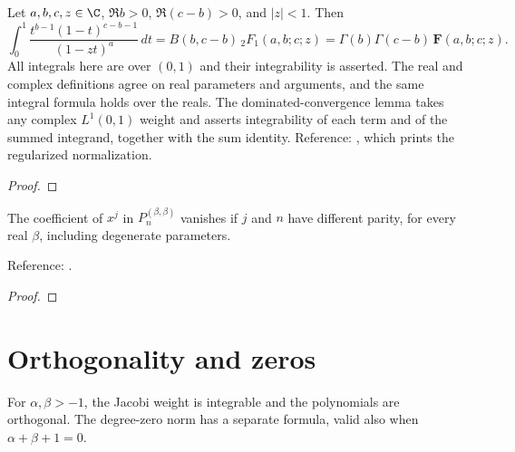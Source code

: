 \begin{supporting}
\begin{theorem}
\label{thm:hypergeometric-euler-integral}
\leanok
Let $a,b,c,z\in\C$, $\Re b>0$, $\Re(c-b)>0$, and $|z|<1$. Then
\[
 \int_0^1\frac{t^{b-1}(1-t)^{c-b-1}}{(1-zt)^a}\,dt
 = B(b,c-b)\,{}_2F_1(a,b;c;z)
 = \Gamma(b)\Gamma(c-b)\,\mathbf F(a,b;c;z).
\]
All integrals here are over $(0,1)$ and their integrability is asserted.
The real and complex definitions agree on real parameters and arguments, and the same integral formula holds over the reals. The dominated-convergence
lemma takes any complex $L^1(0,1)$ weight and asserts integrability of each term
and of the summed integrand, together with the sum identity.
Reference: \cite[15.6.1]{dlmf}, which prints the regularized normalization.
\end{theorem}
\begin{proof}
\leanok
\end{proof}

\begin{theorem}
\label{thm:jacobi-coefficient-parity}
\leanok
The coefficient of $x^j$ in $P_n^{(\beta,\beta)}$ vanishes if $j$ and $n$ have
different parity, for every real $\beta$, including degenerate parameters.

Reference: \cite[Table 18.6.1]{dlmf}.
\end{theorem}
\begin{proof}
\leanok
\end{proof}

\end{supporting}

\section{Orthogonality and zeros}\label{sec:textbook-jacobi-orthogonality}

For $\alpha,\beta>-1$, the Jacobi weight is integrable and the polynomials are orthogonal. The degree-zero norm has a separate formula, valid also when $\alpha+\beta+1=0$.

